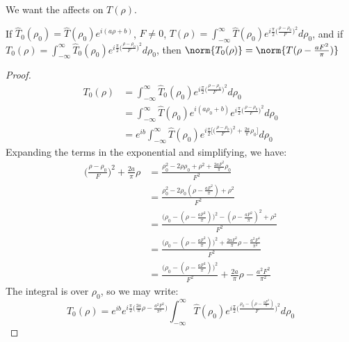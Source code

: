 \documentclass[crop=false,class=book,oneside]{standalone}
\begin{document}
            We want the affects on $T(\rho)$.
            
            \begin{theorem}
            If $\hat{T}_0(\rho_0) = \hat{T}(\rho_0)e^{i(a\rho+b)}$, $F\ne 0$, $T(\rho) = \int_{-\infty}^{\infty}\hat{T}(\rho_0)e^{i\frac{\pi}{2}\big(\frac{\rho-\rho_0}{F}\big)^2} d\rho_0$, and if $T_{0}(\rho) = \int_{-\infty}^{\infty}\hat{T}_{0}(\rho_0)e^{i\frac{\pi}{2}\big(\frac{\rho-\rho_0}{F}\big)^2} d\rho_0$, then $\norm{T_{0}(\rho)} = \norm{T(\rho - \frac{aF^2}{\pi})}$
            \end{theorem}
            \begin{proof}
            \begin{align*}
            T_0(\rho) &= \int_{-\infty}^{\infty} \hat{T}_{0}(\rho_0)e^{i\frac{\pi}{2}\big(\frac{\rho-\rho_0}{F}\big)^2}d\rho_0\\
            &=\int_{-\infty}^{\infty} \hat{T}(\rho_0)e^{i(a\rho_0+b)}e^{i\frac{\pi}{2}\big(\frac{\rho - \rho_0}{F}\big)^2}d\rho_0 \\
            	&= e^{ib}\int_{-\infty}^{\infty}\hat{T}(\rho_0)e^{i\frac{\pi}{2}\bigg[\big(\frac{\rho-\rho_0}{F}\big)^2 + \frac{2a}{\pi}\rho_0\bigg]}d\rho_0
            \end{align*}
            Expanding the terms in the exponential and simplifying, we have:
            \begin{align*}
                \big(\frac{\rho-\rho_0}{F}\big)^2 + \frac{2a}{\pi}\rho &= \frac{\rho_0^2 - 2\rho\rho_0 + \rho^2 + \frac{2aF^2}{\pi}\rho_0}{F^2}\\
                &= \frac{\rho_0^2 - 2\rho_0(\rho - \frac{aF^2}{\pi}) + \rho^2}{F^2}\\
                &= \frac{\big(\rho_0 - (\rho - \frac{aF^2}{\pi})\big)^2 - (\rho - \frac{aF^2}{\pi})^2 + \rho^2}{F^2}\\
                &= \frac{\big(\rho_0 - (\rho-\frac{aF^2}{\pi})\big)^2 +\frac{2aF^2}{\pi}\rho - \frac{a^2F^4}{\pi^2}}{F^2}\\
                &= \frac{\big(\rho_0 - (\rho-\frac{aF^2}{\pi})\big)^2}{F^2} + \frac{2a}{\pi}\rho - \frac{a^2F^2}{\pi^2}
            \end{align*}
            The integral is over $\rho_0$, so we may write:
            \begin{equation*}
            T_0(\rho) = e^{ib}e^{i\frac{\pi}{2}\big(\frac{2a}{\pi}\rho - \frac{a^2F^2}{\pi^2}\big)}\int_{-\infty}^{\infty} \hat{T}(\rho_0)e^{i\frac{\pi}{2}\big(\frac{\rho_0 - (\rho - \frac{aF^2}{\pi})}{F}\big)^2}d\rho_0

\end{equation*}
\end{proof}
\end{document}
